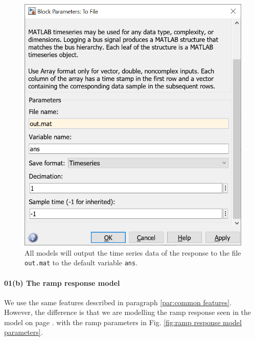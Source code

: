 \documentclass[12pt]{article}
\begin{document}
\begin{figure}[h]
    \centering
    \includegraphics[width=(5in/689)*688]{common_to_file.png}
    \caption{All models will output the time series data of the response to the file \texttt{out.mat} to the default variable \texttt{ans}.}
    \label{fig:common to file}
\end{figure}

\paragraph{01(b) The ramp response model}

We use the same features described in paragraph \ref{par:common features}.
However, the difference is that we are modelling the ramp response seen
in the model on page \pageref{pdf:part01b}.
with the ramp parameters in Fig. \ref{fig:ramp response model parameters}.



\end{document}
